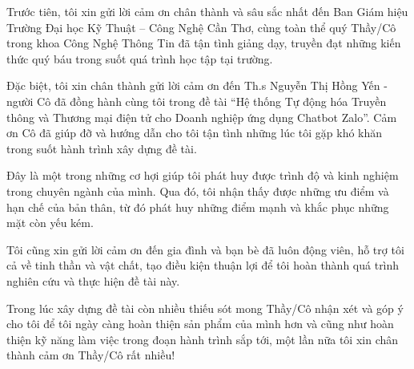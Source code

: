 \begin{acknowledgments}
Trước tiên, tôi xin gửi lời cảm ơn chân thành và sâu sắc nhất đến Ban Giám hiệu Trường Đại học Kỹ Thuật – Công Nghệ Cần Thơ, cùng toàn thể quý Thầy/Cô trong khoa  Công Nghệ Thông Tin đã tận tình giảng dạy, truyền đạt những kiến thức quý báu trong suốt quá trình học tập tại trường.

Đặc biệt, tôi xin chân thành gửi lời cảm ơn đến Th.s Nguyễn Thị Hồng Yến - người Cô đã đồng hành cùng tôi trong đề tài “Hệ thống Tự động hóa Truyền thông và Thương mại điện tử cho Doanh nghiệp ứng dụng Chatbot Zalo”. Cảm ơn Cô đã giúp đỡ và hướng dẫn cho tôi tận tình những lúc tôi gặp khó khăn trong suốt hành trình xây dựng đề tài.

Đây là một trong những cơ hợi giúp tôi phát huy được trình độ và kinh nghiệm trong chuyên ngành của mình. Qua đó, tôi nhận thấy được những ưu điểm và hạn chế của bản thân, từ đó phát huy những điểm mạnh và khắc phục những mặt còn yếu kém. 

Tôi cũng xin gửi lời cảm ơn đến gia đình và bạn bè đã luôn động viên, hỗ trợ tôi cả về tinh thần và vật chất, tạo điều kiện thuận lợi để tôi hoàn thành quá trình nghiên cứu và thực hiện đề tài này.

Trong lúc xây dựng đề tài còn nhiều thiếu sót mong Thầy/Cô nhận xét và góp ý cho tôi để tôi ngày càng hoàn thiện sản phẩm của mình hơn và cũng như hoàn thiện kỹ năng làm việc trong đoạn hành trình sắp tới, một lần nữa tôi xin chân thành cảm ơn Thầy/Cô rất nhiều!

\end{acknowledgments}
